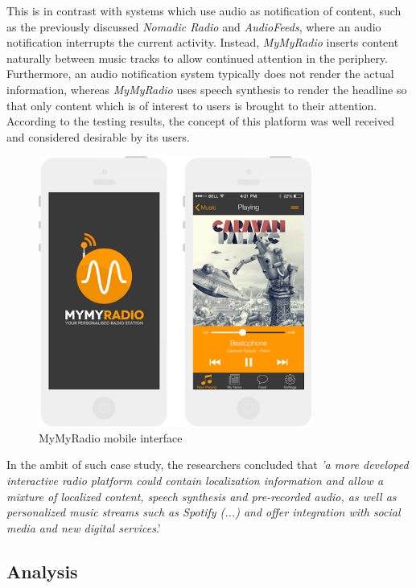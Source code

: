 This is in contrast with systems which use audio as notification of content, such as the previously discussed \textit{Nomadic Radio} and \textit{AudioFeeds}, where an audio notification interrupts the current activity. Instead, \textit{MyMyRadio} inserts content naturally between music tracks to allow continued attention in the periphery. Furthermore, an audio notification system typically does not render the actual information, whereas \textit{MyMyRadio} uses speech synthesis to render the headline so that only content which is of interest to users is brought to their attention. According to the testing results, the concept of this platform was well received and considered desirable by its users.

\begin{figure}[h]
\centering
\includegraphics[width=0.8\textwidth]{./Images/mymyradio.png}
\caption{MyMyRadio mobile interface}
\label{fig:test_env}
\end{figure}

In the ambit of such case study, the researchers concluded that \textit{'a more developed interactive radio platform could contain localization information and allow a mixture of localized content, speech synthesis and pre-recorded audio, as well as personalized music streams such as Spotify (...) and offer integration with social media and new digital services}.'


\subsection{Analysis}

